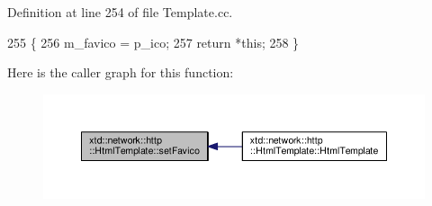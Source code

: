 Definition at line 254 of file Template.\-cc.


\begin{DoxyCode}
255 \{
256   m\_favico = p\_ico;
257   \textcolor{keywordflow}{return} *\textcolor{keyword}{this};
258 \}
\end{DoxyCode}


Here is the caller graph for this function\-:
\nopagebreak
\begin{figure}[H]
\begin{center}
\leavevmode
\includegraphics[width=350pt]{classxtd_1_1network_1_1http_1_1HtmlTemplate_a92496dd5d269160aeb2640908b1920a1_icgraph}
\end{center}
\end{figure}


